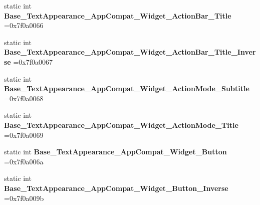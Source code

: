 \begin{DoxyCompactItemize}
\item 
\mbox{\label{classandroid_1_1support_1_1v7_1_1recyclerview_1_1R_1_1style_a6256d86127d529e5602188e0e458b559}} 
static int {\bfseries Base\+\_\+\+Text\+Appearance\+\_\+\+App\+Compat\+\_\+\+Widget\+\_\+\+Action\+Bar\+\_\+\+Title} =0x7f0a0066
\item 
\mbox{\label{classandroid_1_1support_1_1v7_1_1recyclerview_1_1R_1_1style_a328d7c2461a4dc9dc703eeb6a14a194d}} 
static int {\bfseries Base\+\_\+\+Text\+Appearance\+\_\+\+App\+Compat\+\_\+\+Widget\+\_\+\+Action\+Bar\+\_\+\+Title\+\_\+\+Inverse} =0x7f0a0067
\item 
\mbox{\label{classandroid_1_1support_1_1v7_1_1recyclerview_1_1R_1_1style_a57694545877f497a94aa323415eff3fb}} 
static int {\bfseries Base\+\_\+\+Text\+Appearance\+\_\+\+App\+Compat\+\_\+\+Widget\+\_\+\+Action\+Mode\+\_\+\+Subtitle} =0x7f0a0068
\item 
\mbox{\label{classandroid_1_1support_1_1v7_1_1recyclerview_1_1R_1_1style_a4e1bc55911af18ef9f53d86a88fdb760}} 
static int {\bfseries Base\+\_\+\+Text\+Appearance\+\_\+\+App\+Compat\+\_\+\+Widget\+\_\+\+Action\+Mode\+\_\+\+Title} =0x7f0a0069
\item 
\mbox{\label{classandroid_1_1support_1_1v7_1_1recyclerview_1_1R_1_1style_a7d758e72f76fd185c1c5f3d5108dd0c1}} 
static int {\bfseries Base\+\_\+\+Text\+Appearance\+\_\+\+App\+Compat\+\_\+\+Widget\+\_\+\+Button} =0x7f0a006a
\item 
\mbox{\label{classandroid_1_1support_1_1v7_1_1recyclerview_1_1R_1_1style_a874fde4ed01eadd4a901bc716eeab6fc}} 
static int {\bfseries Base\+\_\+\+Text\+Appearance\+\_\+\+App\+Compat\+\_\+\+Widget\+\_\+\+Button\+\_\+\+Inverse} =0x7f0a009b
\item 
\mbox{\label{classandroid_1_1support_1_1v7_1_1recyclerview_1_1R_1_1style_a1f8f7827846291a82bbadd77ef8430f7}} 

\end{DoxyCompactItemize}
